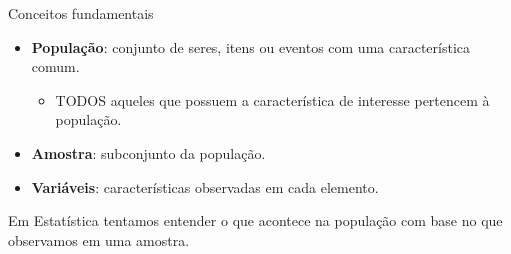 \documentclass[
  ignorenonframetext,
  serif,
  professionalfont,
  usenames,
  dvipsnames,
  aspectratio = 169]{beamer}
\providecommand{\tightlist}{%
  \setlength{\itemsep}{0pt}\setlength{\parskip}{0pt}}
\renewcommand{\tightlist}{%
  \setlength{\itemsep}{0\baselineskip}
  \setlength{\parskip}{0.25\baselineskip}
}
\begin{document}
\begin{frame}{Conceitos fundamentais}
\label{conceitos-fundamentais-1}
\begin{itemize}
\tightlist
\item
  \textbf{População}: conjunto de seres, itens ou eventos com uma
  característica comum.

  \begin{itemize}
  \tightlist
  \item
    TODOS aqueles que possuem a característica de interesse pertencem à
    população.
  \end{itemize}
\item
  \textbf{Amostra}: subconjunto da população.
\item
  \textbf{Variáveis}: características observadas em cada elemento.
\end{itemize}

Em Estatística tentamos entender o que acontece na população com base no
que observamos em uma amostra.
\end{frame}
\end{document}
